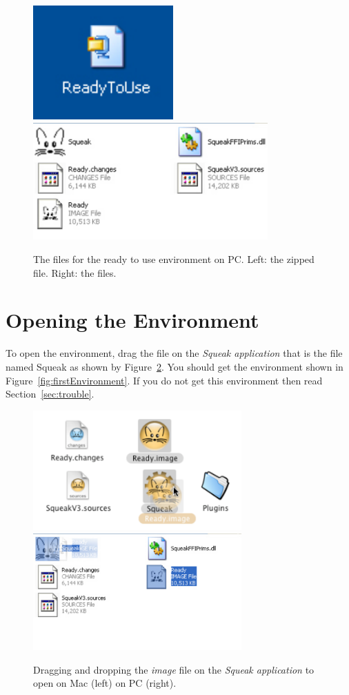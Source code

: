 \begin{figure}[h]\centerline{\includegraphics{zipPC}\includegraphics[width=9cm]{readyPC}} 
\caption{The files for the ready to use environment on PC. Left: the zipped file. Right: the files.\label{fig:pcfiles}}
\end{figure}


\section{Opening the Environment} 
To open the environment, drag the file  on the \emph{Squeak application} that is the file named Squeak as shown by Figure~\ref{fig:dropImage}. You should get the environment shown in Figure~\ref{fig:firstEnvironment}. If you do not get this environment then read Section~\ref{sec:trouble}.

\begin{figure}[!h]\centerline{\includegraphics[width=8cm]{dropImage2}  \includegraphics[width=8cm]{readyDD}} 
\caption{Dragging and dropping the \textit{image} file on the 
\textit{Squeak application} to open on Mac (left) on PC (right).\label{fig:dropImage}}
\end{figure}

